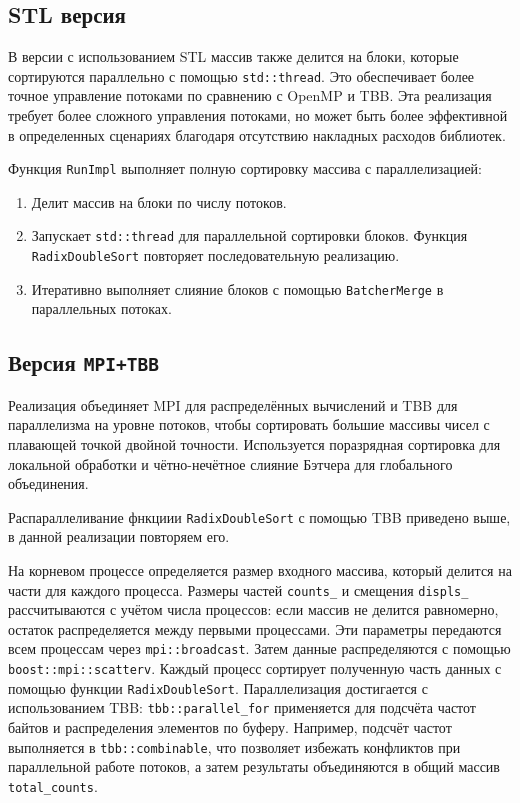 \documentclass[12pt,a4paper]{extarticle}
\begin{document}
	\subsection{STL версия}
	В версии с использованием STL массив также делится на блоки, которые сортируются параллельно с помощью \texttt{std::thread}. Это обеспечивает более точное управление потоками по сравнению с OpenMP и TBB. Эта реализация требует более сложного управления потоками, но может быть более эффективной в определенных сценариях благодаря отсутствию накладных расходов библиотек.
	

	Функция \texttt{RunImpl} выполняет полную сортировку массива с параллелизацией:
	
	\begin{enumerate}
		\item Делит массив на блоки по числу потоков.
		\item Запускает \texttt{std::thread} для параллельной сортировки блоков. Функция \texttt{RadixDoubleSort} повторяет последовательную реализацию.
		\item Итеративно выполняет слияние блоков с помощью \texttt{BatcherMerge} в параллельных потоках.
	\end{enumerate}
	
	\subsection{Версия \texttt{MPI+TBB}}
	Реализация объединяет MPI для распределённых вычислений и TBB для параллелизма на уровне потоков, чтобы сортировать большие массивы чисел с плавающей точкой двойной точности. Используется поразрядная сортировка для локальной обработки и чётно-нечётное слияние Бэтчера для глобального объединения.
	
	
	Распараллеливание фнкциии \texttt{RadixDoubleSort} с помощью TBB приведено выше, в данной реализации повторяем его.

	
	На корневом процессе определяется размер входного массива, который делится на части для каждого процесса. Размеры частей  \texttt{counts\_} и смещения  \texttt{displs\_} рассчитываются с учётом числа процессов: если массив не делится равномерно, остаток распределяется между первыми процессами. Эти параметры передаются всем процессам через  \texttt{mpi::broadcast}. Затем данные распределяются с помощью  \texttt{boost::mpi::scatterv}.
	Каждый процесс сортирует полученную часть данных с помощью функции  \texttt{RadixDoubleSort}. Параллелизация достигается с использованием TBB:  \texttt{tbb::parallel\_for} применяется для подсчёта частот байтов и распределения элементов по буферу. Например, подсчёт частот выполняется в  \texttt{tbb::combinable}, что позволяет избежать конфликтов при параллельной работе потоков, а затем результаты объединяются в общий массив  \texttt{total\_counts}.
	
\end{document}

